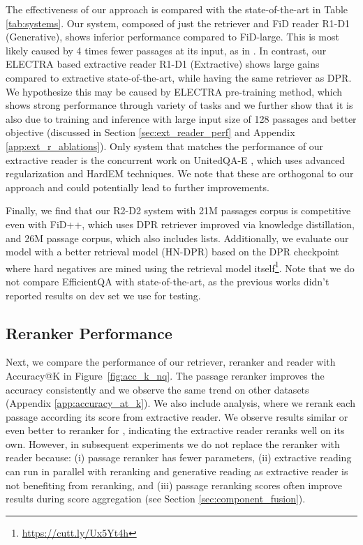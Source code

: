 \documentclass[11pt]{article}
\begin{document}
The effectiveness of our approach is compared with the state-of-the-art in Table \ref{tab:systems}. 
Our system, composed of just the retriever and FiD reader R1-D1 (Generative), shows inferior performance compared to FiD-large. 
This is most likely caused by 4 times fewer passages at its input, as in \citet{izacard2020leveraging}. 
In contrast, our ELECTRA based extractive reader R1-D1 (Extractive) shows large gains compared to extractive state-of-the-art, while having the same retriever as DPR.
We hypothesize this may be caused by ELECTRA pre-training method, which shows strong performance through variety of tasks and we further show that it is also due to training and inference with large input size of 128 passages and better objective (discussed in Section \ref{sec:ext_reader_perf} and Appendix \ref{app:ext_r_ablations}).
Only system that matches the performance of our extractive reader is the concurrent work on UnitedQA-E \cite{cheng2021unitedqa}, which uses advanced regularization and HardEM techniques. We note that these are orthogonal to our approach and could potentially lead to further improvements.

Finally, we find that our R2-D2 system with 21M passages corpus is competitive even with FiD++, which uses DPR retriever improved via knowledge distillation, and 26M passage corpus, which also includes lists. 
Additionally, we evaluate our model with a better retrieval model (HN-DPR) based on the DPR checkpoint where hard negatives are mined using the retrieval model itself\footnote{\url{https://cutt.ly/Ux5Yt4h}}.
Note that we do not compare EfficientQA with state-of-the-art, as the previous works didn't reported results on dev set we use for testing.


\subsection{Reranker Performance}
Next, we compare the performance of our retriever, reranker and reader with Accuracy@K in Figure~\ref{fig:acc_k_nq}. 
The passage reranker improves the accuracy consistently and we observe the same trend on other datasets (Appendix \ref{app:accuracy_at_k}).
We also include analysis, where we rerank each passage  according its  score from extractive reader.
We observe results similar or even better to reranker for , indicating the extractive reader reranks well on its own.
However, in subsequent experiments we do not replace the reranker with reader because: (i) passage reranker has fewer parameters, (ii) extractive reading can run in parallel with reranking and generative reading as extractive reader is not benefiting from reranking, and (iii) passage reranking scores often improve results during score aggregation (see Section \ref{sec:component_fusion}).
\end{document}
